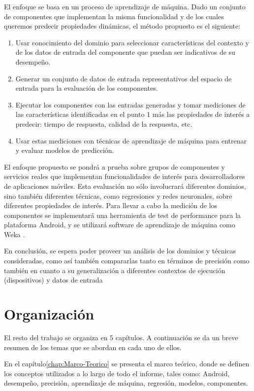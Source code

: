 El enfoque se basa en un proceso de aprendizaje de máquina. Dado un
conjunto de componentes que implementan la misma funcionalidad y de
los cuales queremos predecir propiedades dinámicas, el método propuesto
es el siguiente: 
\begin{enumerate}
\item Usar conocimiento del dominio para seleccionar características del
contexto y de los datos de entrada del componente que puedan ser indicativos
de su desempeño. 
\item Generar un conjunto de datos de entrada representativos del espacio
de entrada para la evaluación de los componentes. 
\item Ejecutar los componentes con las entradas generadas y tomar mediciones
de las características identificadas en el punto 1 más las propiedades
de interés a predecir: tiempo de respuesta, calidad de la respuesta,
etc. 
\item Usar estas mediciones con técnicas de aprendizaje de máquina para
entrenar y evaluar modelos de predicción. 
\end{enumerate}
El enfoque propuesto se pondrá a prueba sobre grupos de componentes
y servicios reales que implementan funcionalidades de interés para
desarrolladores de aplicaciones móviles. Esta evaluación no sólo involucrará
diferentes dominios, sino también diferentes técnicas, como regresiones
y redes neuronales, sobre diferentes propiedades de interés. Para
llevar a cabo la medición de los componentes se implementará una herramienta
de test de performance para la plataforma Android, y se utilizará
software de aprendizaje de máquina como Weka \cite{Hall2009}. 

En conclusión, se espera poder proveer un análisis de los dominios
y técnicas consideradas, como así también compararlas tanto en términos
de precisión como también en cuanto a su generalización a diferentes
contextos de ejecución (dispositivos) y datos de entrada


\section{Organización\label{sec:Organizaci=0000F3n}}

El resto del trabajo se organiza en 5 capítulos. A continuación se
da un breve resumen de los temas que se abordan en cada uno de ellos. 

En el capítulo\ref{chap:Marco-Teorico} se presenta el marco teórico,
donde se definen los conceptos utilizados a lo largo de todo el informe,
tales como: Android, desempeño, precisión, aprendizaje de máquina,
regresión, modelos, componentes. 

